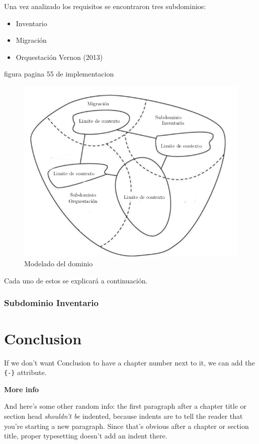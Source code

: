 \documentclass[12pt,twoside]{reedthesis}
\providecommand{\tightlist}{%
  \setlength{\itemsep}{0pt}\setlength{\parskip}{0pt}}
\theoremstyle{definition}
\theoremstyle{definition}
\theoremstyle{definition}
\theoremstyle{remark}
\begin{document}
Una vez analizado los requisitos se encontraron tres subdominios:
\begin{itemize}
\tightlist
\item
  Inventario
\item
  Migración
\item
  Orquestación Vernon (2013)
\end{itemize}
figura pagina 55 de implementacion
\begin{figure}[h!]
  \centering
  \includegraphics[scale=0.5]{./figure/Cap4/plantillaDDD.png}
  \caption{Modelado del dominio}\label{DDDplantilla}
\end{figure}
Cada uno de estos se explicará a continuación.

\hypertarget{subdominio-inventario}{%
\subsection{Subdominio Inventario}\label{subdominio-inventario}}

\hypertarget{conclusion}{%
\chapter*{Conclusion}\label{conclusion}}

If we don't want Conclusion to have a chapter number next to it, we can
add the \texttt{\{-\}} attribute.

\textbf{More info}

And here's some other random info: the first paragraph after a chapter
title or section head \emph{shouldn't be} indented, because indents are
to tell the reader that you're starting a new paragraph. Since that's
obvious after a chapter or section title, proper typesetting doesn't add
an indent there.
\end{document}
